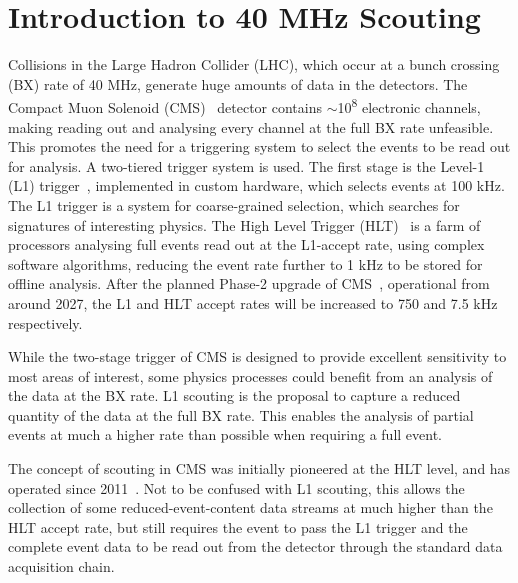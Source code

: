 \documentclass[10pt, paper=a4, UKenglish]{article}
\begin{document}
\normalsize 


\section{Introduction to 40 MHz Scouting}
\label{Introduction}

Collisions in the Large Hadron Collider (LHC), which occur at a bunch crossing (BX) rate of 40 MHz, generate huge amounts of data in the detectors. The Compact Muon Solenoid (CMS)~\cite{tdr} detector contains $\sim$10\textsuperscript{8} electronic channels, making reading out and analysing every channel at the full BX rate unfeasible. This promotes the need for a triggering system to select the events to be read out for analysis. A two-tiered trigger system is used. The first stage is the Level-1 (L1) trigger~\cite{trigger}, implemented in custom hardware, which selects events at 100 kHz. The L1 trigger is a system for coarse-grained selection, which searches for signatures of interesting physics. The High Level Trigger (HLT)~\cite{trigger} is a farm of processors analysing full events read out at the L1-accept rate, using complex software algorithms, reducing the event rate further to 1 kHz to be stored for offline analysis. After the planned Phase-2 upgrade of CMS~\cite{tdr}, operational from around 2027, the L1 and HLT accept rates will be increased to 750 and 7.5 kHz respectively.

While the two-stage trigger of CMS is designed to provide excellent sensitivity to most areas of interest, some physics processes could benefit from an analysis of the data at the BX rate. L1 scouting is the proposal to capture a reduced quantity of the data at the full BX rate. This enables the analysis of partial events at much a higher rate than possible when requiring a full event. 



The concept of scouting in CMS was initially pioneered at the HLT level, and has operated since 2011~\cite{dustin}. Not to be confused with L1 scouting, this allows the collection of some reduced-event-content data streams at much higher than the HLT accept rate, but still requires the event to pass the L1 trigger and the complete event data to be read out from the detector through the standard data acquisition chain. 
\end{document}
